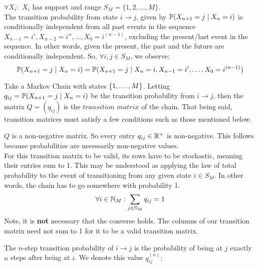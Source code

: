  $\forall X_i:$ $X_i$ has support and range $S_M = \{1,2,...,M\}$. \\

 The transition probability from state $i \to j$, given by $\Prb(X_{n+1} = j \mid X_n = i)$ is conditionally independent from all past events in the sequence $X_{n-1} = i',X_{n-2} = i'', \dots,X_0 = i^{(n-1)}$, excluding the present/last event in the sequence. In other words, given the present, the past and the future are conditionally independent. So, $\forall i,j \in S_M$, we observe:
$$ \Prb(X_{n+1} = j \mid X_n = i) = \Prb(X_{n+1} = j \mid X_n = i, X_{n-1} = i', \dots,X_0 = i^{(n-1)})$$

\newpage
{}

\begin{definition}
Take a Markov Chain with states $\{\oneto[M]\}$.
Letting $q_{ij} = \P(X_{n+1} = j \mid X_n = i)$ be the transition probability from $i \to j$, then the matrix $Q=(q_{ij})$ is the $\textit{transition matrix}$ of the chain.
That being said, transition matrices must satisfy a few conditions such as those mentioned below.
\end{definition}



 $Q$ is a non-negative matrix. So every entry $q_{ij} \in \R^+$ is non-negative.
This follows because probabilities are necessarily non-negative values. \\

 For this transition matrix to be valid, its rows have to be stochastic, meaning their entries sum to 1. This may be understood as applying the law of total probability to the event of transitioning from any given state $i \in S_M$. In other words, the chain has to go somewhere with probability 1.
$$\forall i \in \N_M: \sum_{j \in \N_M} q_{ij} = 1$$
Note, it is \textbf{not} necessary that the converse holds. The columns of our transition matrix need not sum to 1 for it to be a valid transition matrix.


\begin{definition} The $n$-step transition probability of $i \to j$ is the probability of being at $j$ exactly $n$ steps after being at $i$. We denote this value $q_{ij}^{(n)}:$
\end{definition}

